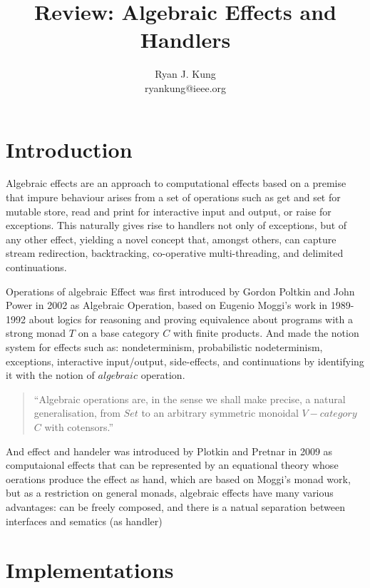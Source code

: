 \documentclass[twocolumn]{article}
\author{Ryan J. Kung \\ryankung@ieee.org\\}
\title{Review: Algebraic Effects and Handlers}
\begin{document}
\maketitle

\section{Introduction}

Algebraic eﬀects are an approach to computational eﬀects based on a premise that impure behaviour arises from a set of operations such as get and set for mutable store, read and print for interactive input and output, or raise for exceptions. This naturally gives rise to handlers not only of exceptions, but of any other eﬀect, yielding a novel concept that, amongst others, can capture stream redirection, backtracking, co-operative multi-threading, and delimited continuations\cite{intro-algebraic-effects-and-handlers}. 

Operations of algebraic Effect was first introduced by Gordon Poltkin and John Power in 2002 \cite{Plotkin2003} as Algebraic Operation, based on Eugenio Moggi's work \cite{39155, MOGGI91} in 1989-1992 about logics for reasoning and proving equivalence about programs with a strong monad $T$ on a base category $C$ with finite products\cite{Plotkin2003, MOGGI91}. And made the notion system for effects such as: nondeterminism, probabilistic nodeterminism, exceptions, interactive input/output, side-effects, and continuations by identifying it with the notion of $algebraic$ operation.

\begin{quotation}
  ``Algebraic operations are, in the sense we shall make precise, a natural generalisation, from $Set$ to an arbitrary symmetric monoidal $V-category$ $C$ with cotensors.''\cite{Plotkin2003}
\end{quotation}

And effect and handeler was introduced by Plotkin and Pretnar in 2009 \cite{lmcs:705} as computaional effects that can be represented by an equational theory whose oerations produce the effect as hand, which are based on Moggi's monad work, but as a restriction on general monads, algebraic effects have many various advantages: can be freely composed, and there is a natual separation between interfaces and sematics (as handler) \cite{algebraic-effects-for-functional-programming}

\section{Implementations}
\end{document}
